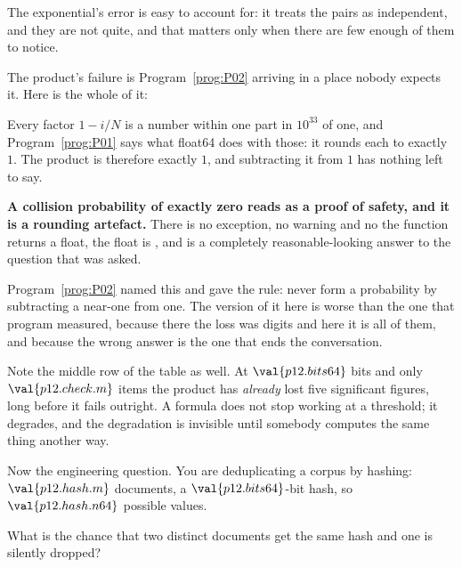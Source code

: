 \begin{fr}
The exponential's error is easy to account for: it treats the pairs as
independent, and they are not quite, and that matters only when there are few
enough of them to notice.

The product's failure is Program~\ref{prog:P02} arriving in a place nobody
expects it. Here is the whole of it:


Every factor $1 - i/N$ is a number within one part in $10^{33}$ of one, and
Program~\ref{prog:P01} says what float64 does with those: it rounds each to
exactly $1$. The product is therefore exactly $1$, and subtracting it from $1$
has nothing left to say.

\begin{trapbox}
\textbf{A collision probability of exactly zero reads as a proof of safety,
and it is a rounding artefact.} There is no exception, no warning and no
 \dash{} the function returns a float, the float is , and
 is a completely reasonable-looking answer to the question that was
asked.

Program~\ref{prog:P02} named this and gave the rule: never form a probability
by subtracting a near-one from one. The version of it here is worse than the
one that program measured, because there the loss was digits and here it is
all of them, and because the wrong answer is the one that ends the
conversation.

Note the middle row of the table as well. At $\val{p12.bits64}$ bits and only
$\val{p12.check.m}$ items the product has \emph{already} lost five significant
figures, long before it fails outright. A formula does not stop working at a
threshold; it degrades, and the degradation is invisible until somebody
computes the same thing another way.
\end{trapbox}
\end{fr}

\begin{fr}
Now the engineering question. You are deduplicating a corpus by hashing:
$\val{p12.hash.m}$ documents, a $\val{p12.bits64}$-bit hash, so
$\val{p12.hash.n64}$ possible values.

What is the chance that two distinct documents get the same hash and one is
silently dropped?
\dotline
\nextframe
\end{fr}


